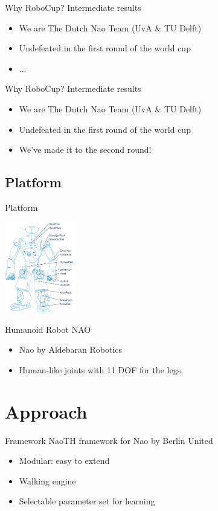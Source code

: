 \documentclass{beamer}
\begin{document}
\begin{frame}{Why RoboCup?}
	Intermediate results
	\begin{itemize}
		\item We are The Dutch Nao Team (UvA \& TU Delft)
		\item Undefeated in the first round of the world cup
		\item ...
	\end{itemize}
\end{frame}

\begin{frame}{Why RoboCup?}
	Intermediate results
	\begin{itemize}
		\item We are The Dutch Nao Team (UvA \& TU Delft)
		\item Undefeated in the first round of the world cup
		\item We've made it to the second round!
	\end{itemize}
\end{frame}

\subsection{Platform}
\begin{frame}{Platform}
	\begin{center}
		\includegraphics[width = 0.23\textwidth]{naospecsJoints}
	\end{center}
	\begin{block}{Humanoid Robot NAO}
		\begin{itemize}
			\item Nao by Aldebaran Robotics
			\item Human-like joints with 11 DOF for the legs.
		\end{itemize}
	\end{block}
\end{frame}

\section{Approach}
\begin{frame}{Framework}
NaoTH framework for Nao by Berlin United \cite{naothdescription}
\begin{itemize}
\item Modular: easy to extend
\item Walking engine
\item Selectable parameter set for learning
\end{itemize}
\end{frame}
\end{document}
